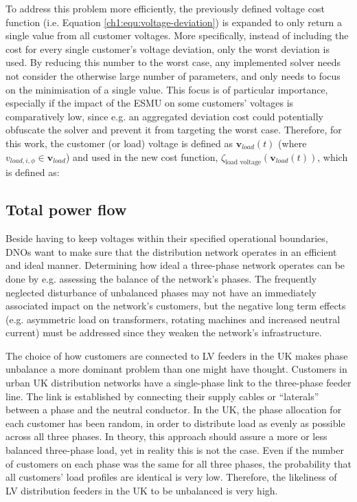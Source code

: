 To address this problem more efficiently, the previously defined voltage cost function (i.e. Equation \ref{ch1:equ:voltage-deviation}) is expanded to only return a single value from all customer voltages.
More specifically, instead of including the cost for every single customer's voltage deviation, only the worst deviation is used.
By reducing this number to the worst case, any implemented solver needs not consider the otherwise large number of parameters, and only needs to focus on the minimisation of a single value.
This focus is of particular importance, especially if the impact of the ESMU on some customers' voltages is comparatively low, since e.g. an aggregated deviation cost could potentially obfuscate the solver and prevent it from targeting the worst case.
Therefore, for this work, the customer (or load) voltage is defined as $\textbf{v}_{load}(t)$ (where $v_{load,i,\phi} \in \textbf{v}_{load}$) and used in the new cost function, $\zeta_\text{load voltage}(\textbf{v}_{load}(t))$, which is defined as:



\subsection{Total power flow}
\label{ch1:subsec:total-power-flow}

Beside having to keep voltages within their specified operational boundaries, DNOs want to make sure that the distribution network operates in an efficient and ideal manner.
Determining how ideal a three-phase network operates can be done by e.g. assessing the balance of the network's phases.
The frequently neglected disturbance of unbalanced phases may not have an immediately associated impact on the network's customers, but the negative long term effects (e.g. asymmetric load on transformers, rotating machines and increased neutral current) must be addressed since they weaken the network's infrastructure.

The choice of how customers are connected to LV feeders in the UK makes phase unbalance a more dominant problem than one might have thought.
Customers in urban UK distribution networks have a single-phase link to the three-phase feeder line.
The link is established by connecting their supply cables or ``laterals'' between a phase and the neutral conductor.
In the UK, the phase allocation for each customer has been random, in order to distribute load as evenly as possible across all three phases.
In theory, this approach should assure a more or less balanced three-phase load, yet in reality this is not the case.
Even if the number of customers on each phase was the same for all three phases, the probability that all customers' load profiles are identical is very low.
Therefore, the likeliness of LV distribution feeders in the UK to be unbalanced is very high.

